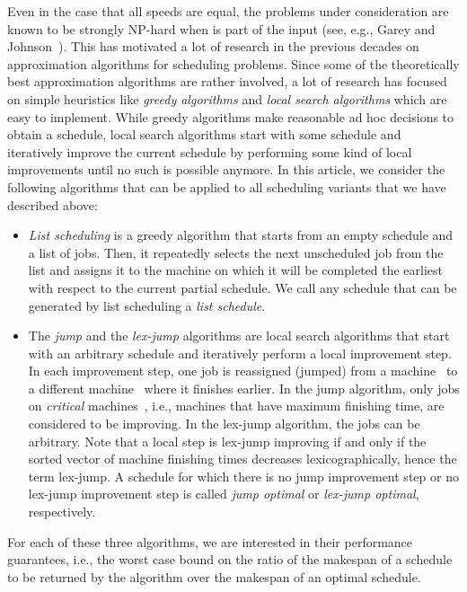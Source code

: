 \documentclass[a4paper,11pt,fleqn]{article}
\begin{document}
Even in the case that all speeds are equal, the problems under
 consideration are known to be
strongly NP-hard when  is part of the input (see, e.g., Garey and
Johnson~\cite{Garey+Johnson:1979}). This has motivated a lot of research in the
previous decades on approximation algorithms for scheduling problems. Since some
of the theoretically best approximation algorithms are rather involved, a lot of
research has focused on simple heuristics like \emph{greedy algorithms} and \emph{local
search algorithms} which are easy to implement. While greedy algorithms
make reasonable ad hoc decisions to obtain a schedule, local search algorithms start with
some schedule and iteratively improve the current schedule by performing some
kind of local improvements until no such is possible anymore. 
In this article, we consider the following algorithms that can be applied to all scheduling variants that we have described above:
\begin{itemize}

  \item \emph{List scheduling} is a greedy algorithm that starts from an empty schedule and a list of jobs. Then, it repeatedly selects the next unscheduled job from the list and assigns it to the machine on which it will be completed the earliest with respect to the current partial schedule. We call any schedule that can be generated by list scheduling a \emph{list schedule}.

  \item The \emph{jump} and the \emph{lex-jump} algorithms are local
search algorithms that start with an arbitrary schedule and iteratively
perform a local improvement step. In each improvement step, one job is
reassigned (jumped) from a machine~ to a different machine~ where it
finishes earlier. In the jump algorithm, only jobs on \emph{critical}
machines~, i.e., machines that have maximum finishing time, are
considered to be improving. In the lex-jump algorithm, the jobs can
be arbitrary. Note that a local step is lex-jump improving if and only if the sorted vector of machine finishing times decreases lexicographically, hence the term lex-jump.
A schedule for which there is no jump improvement step or no lex-jump improvement step is called \emph{jump optimal} or \emph{lex-jump optimal}, respectively.

\end{itemize}
For each of these three algorithms, we are interested in  their performance guarantees, i.e., the worst case bound on the ratio of the makespan of a schedule to be returned by the algorithm over the makespan of an optimal schedule.
\end{document}
